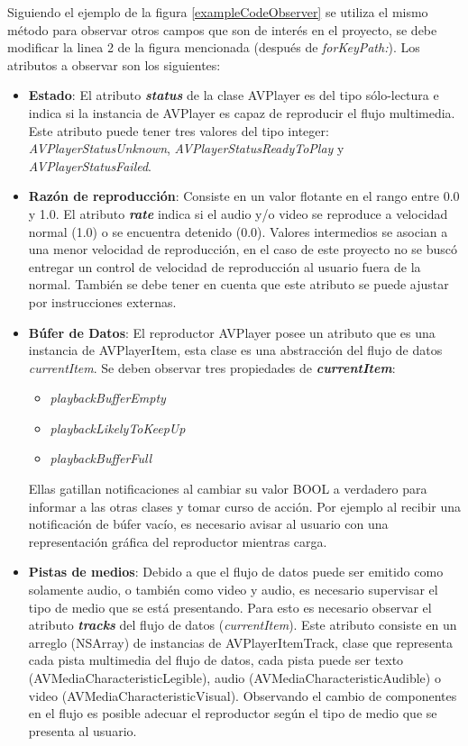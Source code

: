  Siguiendo el ejemplo de la figura \ref{exampleCodeObserver} se utiliza el mismo método para observar otros campos que son de interés en el proyecto, se debe modificar la linea 2 de la figura mencionada (después de \textit{forKeyPath:}). Los atributos a observar son los siguientes: 
\begin{itemize}
\item \textbf{Estado}: El atributo \textit{\textbf{status}} de la clase AVPlayer es del tipo sólo-lectura e indica si la instancia de AVPlayer es capaz de reproducir el flujo multimedia. Este atributo puede tener tres valores del tipo integer: \textit{AVPlayerStatusUnknown}, \textit{AVPlayerStatusReadyToPlay} y \textit{AVPlayerStatusFailed}.

\item \textbf{Razón de reproducción}: Consiste en un valor flotante en el rango entre 0.0 y 1.0. El atributo \textbf{\textit{rate}} indica si el audio y/o video se reproduce a velocidad normal (1.0) o se encuentra detenido (0.0). Valores intermedios se asocian a una menor velocidad de reproducción, en el caso de este proyecto no se buscó entregar un control de velocidad de reproducción al usuario fuera de la normal. También se debe tener en cuenta que este atributo se puede ajustar por instrucciones externas.

\item \textbf{Búfer de Datos}: El reproductor AVPlayer posee un atributo que es una instancia de AVPlayerItem, esta clase es una abstracción del flujo de datos \textit{currentItem}. Se deben observar tres propiedades de \textit{\textbf{currentItem}}: 
\begin{itemize}
\item \textit{playbackBufferEmpty}
\item \textit{playbackLikelyToKeepUp}
\item \textit{playbackBufferFull}
\end{itemize}
Ellas gatillan notificaciones al cambiar su valor BOOL a verdadero para informar a las otras clases y tomar curso de acción. Por ejemplo al recibir una notificación de búfer vacío, es necesario avisar al usuario con una representación gráfica del reproductor mientras carga.

\item \textbf{Pistas de medios}: Debido a que el flujo de datos puede ser emitido como solamente audio, o también como video y audio, es necesario supervisar el tipo de medio que se está presentando. Para esto es necesario observar el atributo \textit{\textbf{tracks}} del flujo de datos (\textit{currentItem}). Este atributo consiste en un arreglo (NSArray) de instancias de AVPlayerItemTrack, clase que representa cada pista multimedia del flujo de datos, cada pista puede ser texto (AVMediaCharacteristicLegible), audio (AVMediaCharacteristicAudible) o video (AVMediaCharacteristicVisual). Observando el cambio de componentes en el flujo es posible adecuar el reproductor según el tipo de medio que se presenta al usuario.


\end{itemize}

